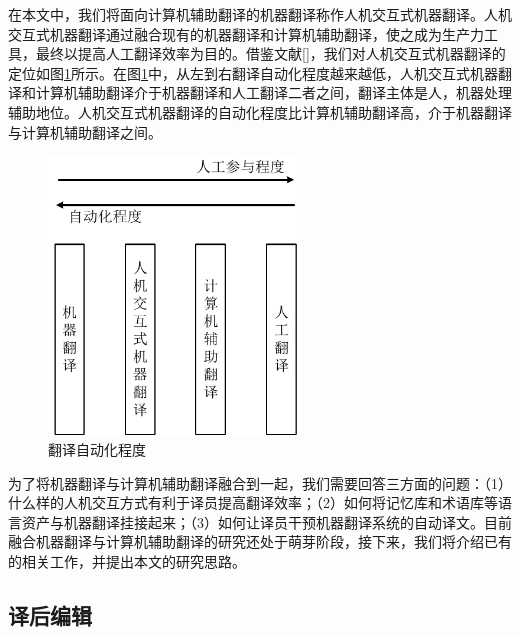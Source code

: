 在本文中，我们将面向计算机辅助翻译的机器翻译称作人机交互式机器翻译。人机交互式机器翻译通过融合现有的机器翻译和计算机辅助翻译，使之成为生产力工具，最终以提高人工翻译效率为目的。借鉴文献[\cite{Hutchins:1992}]，我们对人机交互式机器翻译的定位如图\ref{Fig_automation_degree}所示。在图\ref{Fig_automation_degree}中，从左到右翻译自动化程度越来越低，人机交互式机器翻译和计算机辅助翻译介于机器翻译和人工翻译二者之间，翻译主体是人，机器处理辅助地位。人机交互式机器翻译的自动化程度比计算机辅助翻译高，介于机器翻译与计算机辅助翻译之间。

\begin{figure}[!tb]
	\centering
	\includegraphics[width=0.6\textwidth]{Figure/Figure_2_8.pdf}
	\caption{翻译自动化程度}
	\label{Fig_automation_degree}
\end{figure}

为了将机器翻译与计算机辅助翻译融合到一起，我们需要回答三方面的问题：（1）什么样的人机交互方式有利于译员提高翻译效率；（2）如何将记忆库和术语库等语言资产与机器翻译挂接起来；（3）如何让译员干预机器翻译系统的自动译文。目前融合机器翻译与计算机辅助翻译的研究还处于萌芽阶段，接下来，我们将介绍已有的相关工作，并提出本文的研究思路。

\subsection{译后编辑}

